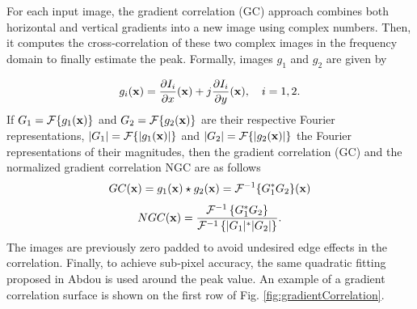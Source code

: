For each input image, the gradient correlation (GC) approach \cite{Argyriou2004} combines both horizontal and vertical gradients into a new image using complex numbers. Then, it computes the cross-correlation of these two complex images in the frequency domain to finally estimate the peak. Formally, images $g_1$ and $g_2$ are given by

\begin{equation}
	g_i(\mathbf{x}) = \frac{\partial I_i}{\partial x}(\mathbf{x}) + j\frac{\partial I_i}{\partial y}(\mathbf{x}), \quad i=1,2.
\end{equation}
If $G_1=\mathcal{F}\{g_1(\mathbf{x})\}$ and $G_2=\mathcal{F}\{g_2(\mathbf{x})\}$ are their respective Fourier representations, $|G_1|=\mathcal{F}\{|g_1(\mathbf{x})|\}$ and $|G_2|=\mathcal{F}\{|g_2(\mathbf{x})|\}$ the Fourier representations of their magnitudes, then the gradient correlation (GC) and the normalized gradient correlation NGC are as follows
\begin{equation}
	GC(\mathbf{x}) = g_1(\mathbf{x}) \star g_2(\mathbf{x}) = \mathcal{F}^{-1}\{G_1^*G_2\}(\mathbf{x})
\end{equation}
\begin{equation}
	NGC(\mathbf{x}) = \frac{\mathcal{F}^{-1}\left\{G_1^*G_2\right\}}{ \mathcal{F}^{-1}\left\{|G_1|^*|G_2|\right\} }.
\label{eq:ngc}
\end{equation}
The images are previously zero padded to avoid undesired edge effects in the correlation. Finally, to achieve sub-pixel accuracy, the same quadratic fitting proposed in Abdou \cite{Abdou1998} is used around the peak value. An example of a gradient correlation surface is shown on the first row of Fig. \ref{fig:gradientCorrelation}.


